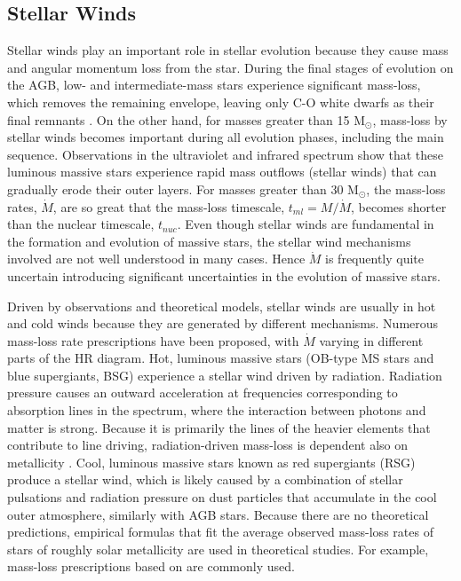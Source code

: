 \subsection{Stellar Winds}

Stellar winds play an important role in stellar evolution because they cause mass and angular momentum loss from the star. During the final stages of evolution on the AGB, low- and intermediate-mass stars experience significant mass-loss, which removes the remaining envelope, leaving only C-O white dwarfs as their final remnants \citep{marigo2007evolution}. On the other hand, for masses greater than 15 M$_{\odot}$, mass-loss by stellar winds becomes important during all evolution phases, including the main sequence. Observations in the ultraviolet and infrared spectrum show that these luminous massive stars experience rapid mass outflows (stellar winds) that can gradually erode their outer layers. For masses greater than 30 M$_{\odot}$, the mass-loss rates, $\dot{M}$, are so great that the mass-loss timescale, $t_{ml} = M / \dot{M}$, becomes shorter than the nuclear timescale, $t_{nuc}$. Even though stellar winds are fundamental in the formation and evolution of massive stars, the stellar wind mechanisms involved are not well understood in many cases. Hence $\dot{M}$ is frequently quite uncertain introducing significant uncertainties in the evolution of massive stars.

Driven by observations and theoretical models, stellar winds are usually in hot and cold winds because they are generated by different mechanisms. Numerous mass-loss rate prescriptions have been proposed, with $\dot{M}$ varying in different parts of the HR diagram. Hot, luminous massive stars (OB-type MS stars and blue supergiants, BSG) experience a stellar wind driven by radiation. Radiation pressure causes an outward acceleration at frequencies corresponding to absorption lines in the spectrum, where the interaction between photons and matter is strong. Because it is primarily the lines of the heavier elements that contribute to line driving, radiation-driven mass-loss is dependent also on metallicity \citep{vink2001mass}. Cool, luminous massive stars known as red supergiants (RSG) produce a stellar wind, which is likely caused by a combination of stellar pulsations and radiation pressure on dust particles that accumulate in the cool outer atmosphere, similarly with AGB stars. Because there are no theoretical predictions, empirical formulas that fit the average observed mass-loss rates of stars of roughly solar metallicity are used in theoretical studies. For example, mass-loss prescriptions based on \cite{reimers1975circumstellar,de1988mass,nieuwenhuijzen1990parametrization} are commonly used.

